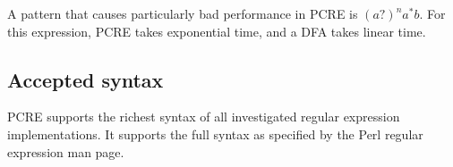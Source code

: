 A pattern that causes particularly bad performance in PCRE is $(a?)^na^*b$. For
this expression, PCRE takes exponential time, and a DFA takes linear time.


\subsection{Accepted syntax}

PCRE supports the richest syntax of all investigated regular expression
implementations. It supports the full syntax as specified by the Perl regular
expression man page.


